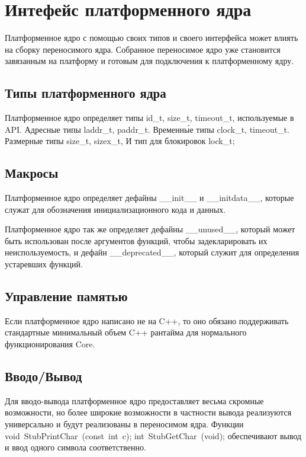\section{Интефейс платформенного ядра}

Платформенное ядро с помощью своих типов и своего интерфейса может влиять на
сборку переносимого ядра. Собранное переносимое ядро уже становится завязанным
на платформу и готовым для подключения к платформенному ядру.

\subsection{Типы платформенного ядра}

Платформенное ядро определяет типы id\_t, size\_t, timeout\_t, используемые в
API. Адресные типы laddr\_t, paddr\_t. Временн\'{ы}е типы clock\_t, timeout\_t.
Размерные типы size\_t, sizex\_t, И тип для блокировок lock\_t;

\subsection{Макросы}

Платформенное ядро определяет дефайны \_\_init\_\_ и \_\_initdata\_\_, которые
служат для обозначения инициализационного кода и данных.

Платформенное ядро так же определяет дефайны \_\_unused\_\_, который может быть
использован после аргументов функций, чтобы задекларировать их неиспользуемость,
и дефайн \_\_deprecated\_\_, который служит для определения устаревших функций.

\subsection{Управление памятью}

Если платформенное ядро написано не на C++, то оно обязано поддерживать
стандартные минимальный объем C++ рантайма для нормального функционирования Core.

\subsection{Вводо/Вывод}

Для вводо-вывода платформенное ядро предоставляет весьма скромные возможности,
но более широкие возможности в частности вывода реализуются универсально и будут
реализованы в переносимом ядра. Функции void~StubPrintChar~(const~int~c); int~StubGetChar~(void); обеспечивают вывод и ввод одного символа соответственно.

